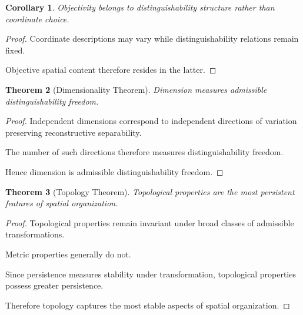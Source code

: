 \documentclass[12pt,oneside]{article}
\newtheorem{theorem}{Theorem}[section] \newtheorem{lemma}[theorem]{Lemma} \newtheorem{proposition}[theorem]{Proposition} \newtheorem{corollary}[theorem]{Corollary}
\theoremstyle{definition}
\begin{document}
\begin{corollary}

Objectivity belongs to distinguishability structure rather than coordinate choice.

\end{corollary}

\begin{proof}

Coordinate descriptions may vary while distinguishability relations remain fixed.

Objective spatial content therefore resides in the latter.

\end{proof}

\begin{theorem}[Dimensionality Theorem]

Dimension measures admissible distinguishability freedom.

\end{theorem}

\begin{proof}

Independent dimensions correspond to independent directions of variation preserving reconstructive separability.

The number of such directions therefore measures distinguishability freedom.

Hence dimension is admissible distinguishability freedom.

\end{proof}

\begin{theorem}[Topology Theorem]

Topological properties are the most persistent features of spatial organization.

\end{theorem}

\begin{proof}

Topological properties remain invariant under broad classes of admissible transformations.

Metric properties generally do not.

Since persistence measures stability under transformation, topological properties possess greater persistence.

Therefore topology captures the most stable aspects of spatial organization.

\end{proof}
\end{document}
